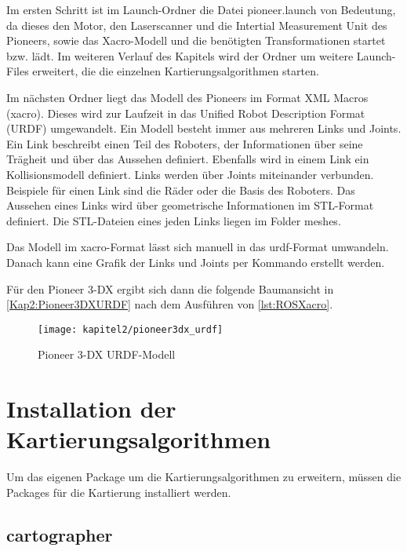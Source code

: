 Im ersten Schritt ist im Launch-Ordner die Datei pioneer.launch von Bedeutung, da dieses den Motor, den Laserscanner und die Intertial Measurement Unit des Pioneers, sowie das Xacro-Modell und die benötigten Transformationen startet bzw. lädt. Im weiteren Verlauf des Kapitels wird der Ordner um weitere Launch-Files erweitert, die die einzelnen Kartierungsalgorithmen starten.

Im nächsten Ordner liegt das Modell des Pioneers im Format XML Macros (xacro). Dieses wird zur Laufzeit in das Unified Robot Description Format (URDF) umgewandelt. Ein Modell besteht immer aus mehreren Links und Joints. Ein Link beschreibt einen Teil des Roboters, der Informationen über seine Trägheit und über das Aussehen definiert. Ebenfalls wird in einem Link ein Kollisionsmodell definiert. Links werden über Joints miteinander verbunden. Beispiele für einen Link sind die Räder oder die Basis des Roboters. Das Aussehen eines Links wird über geometrische Informationen im STL-Format definiert. Die STL-Dateien eines jeden Links liegen im Folder meshes. \autocite{xacroRosWiki} \autocite{urdfRosWiki}

Das Modell im xacro-Format lässt sich manuell in das urdf-Format umwandeln. Danach kann eine Grafik der Links und Joints per Kommando erstellt werden.



Für den Pioneer 3-DX ergibt sich dann die folgende Baumansicht in \autoref{Kap2:Pioneer3DXURDF} nach dem Ausführen von \autoref{lst:ROSXacro}.

\begin{figure}[t]
  \centering
  \texttt{[image: kapitel2/pioneer3dx\_urdf]}
  \caption{Pioneer 3-DX URDF-Modell}
  \label{Kap2:Pioneer3DXURDF}
\end{figure}

\section{Installation der Kartierungsalgorithmen}

Um das eigenen Package um die Kartierungsalgorithmen zu erweitern, müssen die Packages für die Kartierung installiert werden.

\subsection{cartographer}

